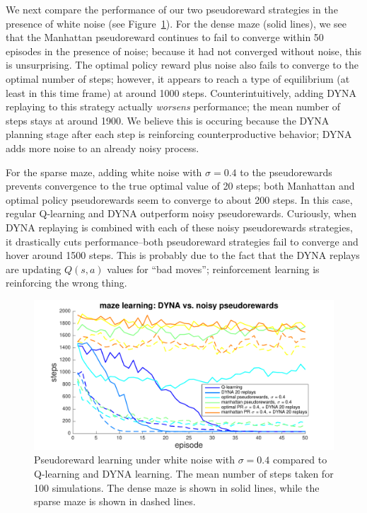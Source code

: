 \documentclass[notitlepage]{article}
\begin{document}
We next compare the performance of our two pseudoreward strategies in the presence of white noise (see Figure~\ref{fig:model-compare-noise}). For the dense maze (solid lines), we see that the Manhattan pseudoreward continues to fail to converge within 50 episodes in the presence of noise; because it had not converged without noise, this is unsurprising. The optimal policy reward plus noise also fails to converge to the optimal number of steps; however, it appears to reach a type of equilibrium (at least in this time frame) at around 1000 steps. Counterintuitively, adding DYNA replaying to this strategy actually \textit{worsens} performance; the mean number of steps stays at around 1900. We believe this is occuring because the DYNA planning stage after each step is reinforcing counterproductive behavior; DYNA adds more noise to an already noisy process. 

For the sparse maze, adding white noise with $\sigma = 0.4$ to the pseudorewards prevents convergence to the true optimal value of 20 steps; both Manhattan and optimal policy pseudorewards seem to converge to about 200 steps. In this case, regular Q-learning and DYNA outperform noisy pseudorewards. Curiously, when DYNA replaying is combined with each of these noisy pseudorewards strategies, it drastically cuts performance--both pseudoreward strategies fail to converge and hover around 1500 steps. This is probably due to the fact that the DYNA replays are updating $Q(s,a)$ values for ``bad moves''; reinforcement learning is reinforcing the wrong thing.

\begin{figure}[ht]
\includegraphics[width=\textwidth]{modelCompareHighNoise}
\caption{Pseudoreward learning under white noise with $\sigma = 0.4$ compared to Q-learning and DYNA learning. The mean number of steps taken for 100 simulations. The dense maze is shown in solid lines, while the sparse maze is shown in dashed lines.}
\label{fig:model-compare-noise}
\end{figure}
\end{document}
